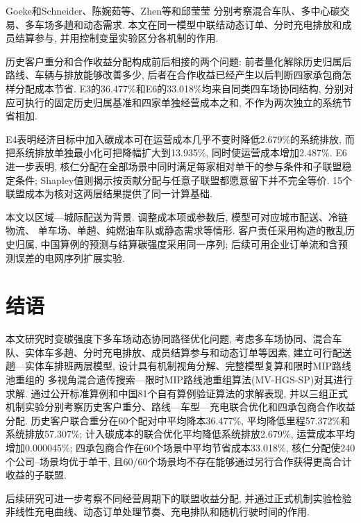 \documentclass{setp-new}
\begin{document}
Goeke和Schneider\cite{ref:27}、陈婉茹等\cite{ref:23}、Zhen等\cite{ref:44}和邱莹莹\cite{ref:71}
分别考察混合车队、多中心碳交易、多车场多趟和动态需求.
本文在同一模型中联结动态订单、分时充电排放和成员结算参与,
并用控制变量实验区分各机制的作用.

历史客户重分和合作收益分配构成前后相接的两个问题:
前者量化解除历史归属后路线、车辆与排放能够改善多少,
后者在合作收益已经产生以后判断四家承包商怎样分配成本节省.
E3的36.477\%和E6的33.018\%均来自同类四车场协同结构,
分别对应可执行的固定历史归属基准和四家单独经营成本之和, 不作为两次独立的系统节省相加.

E4表明经济目标中加入碳成本可在运营成本几乎不变时降低2.679\%的系统排放,
而把系统排放单独最小化可把降幅扩大到13.935\%, 同时使运营成本增加2.487\%.
E6进一步表明, 核仁分配在全部场景中同时满足每家相对单干的参与条件和子联盟稳定条件;
Shapley值则揭示按贡献分配与任意子联盟都愿意留下并不完全等价.
15个联盟成本为核对这两层结果提供了同一计算基础.

本文以区域—城际配送为背景. 调整成本项或参数后, 模型可对应城市配送、冷链物流、
单车场、单趟、纯燃油车队或静态需求等情形.
客户责任采用构造的散乱历史归属, 中国算例的预测与结算碳强度采用同一序列;
后续可用企业订单流和含预测误差的电网序列扩展实验.

\section{结语}

本文研究时变碳强度下多车场动态协同路径优化问题,
考虑多车场协同、混合车队、实体车多趟、分时充电排放、成员结算参与和动态订单等因素,
建立可行配送趟—实体车排班两层模型,
设计具有机制视角分解、完整模型复算和限时MIP路线池重组的
多视角混合遗传搜索—限时MIP路线池重组算法(MV-HGS-SP)对其进行求解.
通过公开标准算例和中国81个自有算例验证算法的求解表现,
并以三组正式机制实验分别考察历史客户重分、路线—车型—充电联合优化和四承包商合作收益分配.
历史客户联合重分在60个配对中平均降本36.477\%, 平均降低里程57.372\%和系统排放57.307\%;
计入碳成本的联合优化平均降低系统排放2.679\%, 运营成本平均增加0.000045\%;
四承包商合作在60个场景中平均节省成本33.018\%, 核仁分配使240个公司--场景均优于单干,
且60/60个场景均不存在能够通过另行合作获得更高合计收益的子联盟.

后续研究可进一步考察不同经营周期下的联盟收益分配,
并通过正式机制实验检验非线性充电曲线、动态订单处理节奏、充电排队和随机行驶时间的作用.

\end{document}
